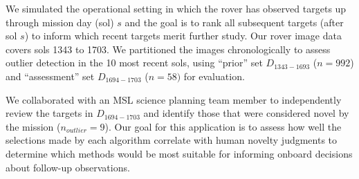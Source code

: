 \documentclass[letterpaper]{article} %
\begin{document}
We simulated the operational setting in which the rover has observed
targets up through mission day (sol) $s$ and the goal is to rank all
subsequent targets (after sol $s$) to inform which recent targets
merit further study.  Our rover image data covers sols \num{1343}
to \num{1703}.  We partitioned the images chronologically to assess
outlier detection in the 10 most recent sols, using ``prior'' set
$D_{1343-1693}$ ($n=992$) and ``assessment'' set $D_{1694-1703}$
($n=58)$ for evaluation.

We collaborated with an MSL science planning team member to
independently review the targets in $D_{1694-1703}$ and identify those
that were 
considered novel by the mission ($n_{outlier} = 9$).  Our goal for
this application is to assess how well the selections made by each
algorithm correlate with human novelty judgments to determine which
methods would be most suitable for informing onboard decisions about
follow-up observations.
\end{document}
